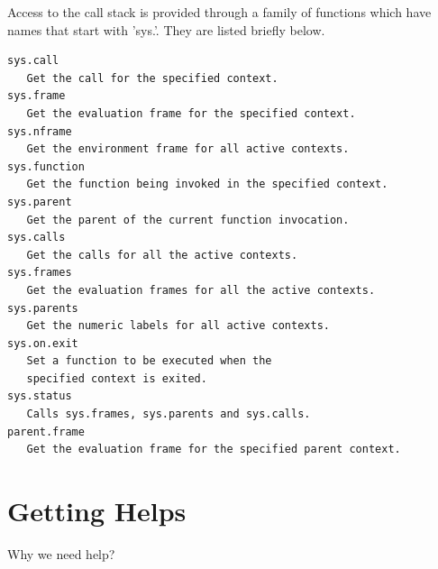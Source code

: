 Access to the call stack is provided through a family of functions
which have names that start with 'sys.'. They are listed briefly
below.

\begin{verbatim}
sys.call
   Get the call for the specified context. 
sys.frame
   Get the evaluation frame for the specified context. 
sys.nframe
   Get the environment frame for all active contexts. 
sys.function
   Get the function being invoked in the specified context. 
sys.parent
   Get the parent of the current function invocation. 
sys.calls
   Get the calls for all the active contexts. 
sys.frames
   Get the evaluation frames for all the active contexts. 
sys.parents
   Get the numeric labels for all active contexts. 
sys.on.exit
   Set a function to be executed when the 
   specified context is exited.   
sys.status
   Calls sys.frames, sys.parents and sys.calls. 
parent.frame
   Get the evaluation frame for the specified parent context.
\end{verbatim}

\section{Getting Helps}
\label{sec:getting-helps}

Why we need help? 

